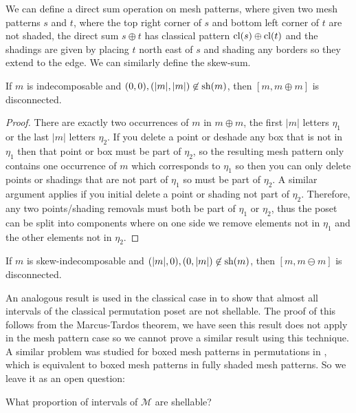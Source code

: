 \documentclass[11pt,a4paper,oneside]{article}
\begin{document}
We can define a direct sum operation on mesh patterns, where given two mesh
patterns $s$ and $t$, where the top right corner of $s$ and bottom left corner
of $t$ are not shaded, the direct sum $s\oplus t$ has classical pattern
$\cl(s)\oplus\cl(t)$ and the shadings are given by placing $t$ north east of $s$
and shading any borders so they extend to the edge. We can similarly define the
skew-sum.

\begin{figure}
\begin{tikzpicture}

\end{tikzpicture}
\end{figure}

\begin{lem}
If $m$ is indecomposable and $(0,0),(|m|,|m|)\not\in\sh(m)$, then
$[m,m\oplus m]$ is disconnected.
\begin{proof}
There are exactly two occurrences of $m$ in $m\oplus m$, the first $|m|$ letters
$\eta_1$ or the last $|m|$ letters $\eta_2$. If you delete a point or deshade
any box that is not in $\eta_1$ then that point or box must be part of $\eta_2$,
so the resulting mesh pattern only contains one occurrence of $m$ which
corresponds to $\eta_1$ so then you can only delete points or shadings that are
not part of $\eta_1$ so must be part of $\eta_2$. A similar argument applies if
you initial delete a point or shading not part of $\eta_2$. Therefore, any two
points/shading removals must both be part of $\eta_1$ or $\eta_2$, thus the
poset can be split into components where on one side we remove elements not in
$\eta_1$ and the other elements not in $\eta_2$.
\end{proof}
\end{lem}
\begin{cor}
If $m$ is skew-indecomposable and $(|m|,0),(0,|m|)\not\in\sh(m)$, then
$[m,m\ominus m]$ is disconnected.
\end{cor}

An analogous result is used in the classical case in \cite{McSt13} to show that
almost all intervals of the classical permutation poset are not shellable. The
proof of this follows from the Marcus-Tardos theorem, we have seen this result
does not apply in the mesh pattern case so we cannot prove a similar result
using this technique.  A similar problem was studied for boxed mesh patterns in
permutations in \cite{AKV13}, which is equivalent to boxed mesh patterns in
fully shaded mesh patterns. So we leave it as an open question:

\begin{que}
What proportion of intervals of $\mathcal{M}$ are shellable?
\end{que}




\end{document}
